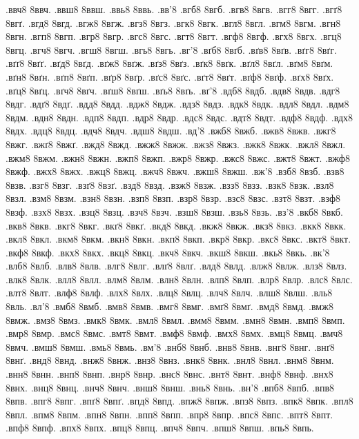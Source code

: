 {.ввч8 8ввч.
.ввш8 8ввш.
.ввь8 8ввь.
.вв'8
.вгб8 8вгб.
.вгв8 8вгв.
.вгг8 8вгг.
.вгґ8 8вгґ.
.вгд8 8вгд.
.вгж8 8вгж.
.вгз8 8вгз.
.вгк8 8вгк.
.вгл8 8вгл.
.вгм8 8вгм.
.вгн8 8вгн.
.вгп8 8вгп.
.вгр8 8вгр.
.вгс8 8вгс.
.вгт8 8вгт.
.вгф8 8вгф.
.вгх8 8вгх.
.вгц8 8вгц.
.вгч8 8вгч.
.вгш8 8вгш.
.вгь8 8вгь.
.вг'8
.вґб8 8вґб.
.вґв8 8вґв.
.вґг8 8вґг.
.вґґ8 8вґґ.
.вґд8 8вґд.
.вґж8 8вґж.
.вґз8 8вґз.
.вґк8 8вґк.
.вґл8 8вґл.
.вґм8 8вґм.
.вґн8 8вґн.
.вґп8 8вґп.
.вґр8 8вґр.
.вґс8 8вґс.
.вґт8 8вґт.
.вґф8 8вґф.
.вґх8 8вґх.
.вґц8 8вґц.
.вґч8 8вґч.
.вґш8 8вґш.
.вґь8 8вґь.
.вґ'8
.вдб8 8вдб.
.вдв8 8вдв.
.вдг8 8вдг.
.вдґ8 8вдґ.
.вдд8 8вдд.
.вдж8 8вдж.
.вдз8 8вдз.
.вдк8 8вдк.
.вдл8 8вдл.
.вдм8 8вдм.
.вдн8 8вдн.
.вдп8 8вдп.
.вдр8 8вдр.
.вдс8 8вдс.
.вдт8 8вдт.
.вдф8 8вдф.
.вдх8 8вдх.
.вдц8 8вдц.
.вдч8 8вдч.
.вдш8 8вдш.
.вд'8
.вжб8 8вжб.
.вжв8 8вжв.
.вжг8 8вжг.
.вжґ8 8вжґ.
.вжд8 8вжд.
.вжж8 8вжж.
.вжз8 8вжз.
.вжк8 8вжк.
.вжл8 8вжл.
.вжм8 8вжм.
.вжн8 8вжн.
.вжп8 8вжп.
.вжр8 8вжр.
.вжс8 8вжс.
.вжт8 8вжт.
.вжф8 8вжф.
.вжх8 8вжх.
.вжц8 8вжц.
.вжч8 8вжч.
.вжш8 8вжш.
.вж'8
.взб8 8взб.
.взв8 8взв.
.взг8 8взг.
.взґ8 8взґ.
.взд8 8взд.
.взж8 8взж.
.взз8 8взз.
.взк8 8взк.
.взл8 8взл.
.взм8 8взм.
.взн8 8взн.
.взп8 8взп.
.взр8 8взр.
.взс8 8взс.
.взт8 8взт.
.взф8 8взф.
.взх8 8взх.
.взц8 8взц.
.взч8 8взч.
.взш8 8взш.
.взь8 8взь.
.вз'8
.вкб8 8вкб.
.вкв8 8вкв.
.вкг8 8вкг.
.вкґ8 8вкґ.
.вкд8 8вкд.
.вкж8 8вкж.
.вкз8 8вкз.
.вкк8 8вкк.
.вкл8 8вкл.
.вкм8 8вкм.
.вкн8 8вкн.
.вкп8 8вкп.
.вкр8 8вкр.
.вкс8 8вкс.
.вкт8 8вкт.
.вкф8 8вкф.
.вкх8 8вкх.
.вкц8 8вкц.
.вкч8 8вкч.
.вкш8 8вкш.
.вкь8 8вкь.
.вк'8
.влб8 8влб.
.влв8 8влв.
.влг8 8влг.
.влґ8 8влґ.
.влд8 8влд.
.влж8 8влж.
.влз8 8влз.
.влк8 8влк.
.влл8 8влл.
.влм8 8влм.
.влн8 8влн.
.влп8 8влп.
.влр8 8влр.
.влс8 8влс.
.влт8 8влт.
.влф8 8влф.
.влх8 8влх.
.влц8 8влц.
.влч8 8влч.
.влш8 8влш.
.вль8 8вль.
.вл'8
.вмб8 8вмб.
.вмв8 8вмв.
.вмг8 8вмг.
.вмґ8 8вмґ.
.вмд8 8вмд.
.вмж8 8вмж.
.вмз8 8вмз.
.вмк8 8вмк.
.вмл8 8вмл.
.вмм8 8вмм.
.вмн8 8вмн.
.вмп8 8вмп.
.вмр8 8вмр.
.вмс8 8вмс.
.вмт8 8вмт.
.вмф8 8вмф.
.вмх8 8вмх.
.вмц8 8вмц.
.вмч8 8вмч.
.вмш8 8вмш.
.вмь8 8вмь.
.вм'8
.внб8 8внб.
.внв8 8внв.
.внг8 8внг.
.внґ8 8внґ.
.внд8 8внд.
.внж8 8внж.
.внз8 8внз.
.внк8 8внк.
.внл8 8внл.
.внм8 8внм.
.внн8 8внн.
.внп8 8внп.
.внр8 8внр.
.внс8 8внс.
.внт8 8внт.
.внф8 8внф.
.внх8 8внх.
.внц8 8внц.
.внч8 8внч.
.внш8 8внш.
.внь8 8внь.
.вн'8
.впб8 8впб.
.впв8 8впв.
.впг8 8впг.
.впґ8 8впґ.
.впд8 8впд.
.впж8 8впж.
.впз8 8впз.
.впк8 8впк.
.впл8 8впл.
.впм8 8впм.
.впн8 8впн.
.впп8 8впп.
.впр8 8впр.
.впс8 8впс.
.впт8 8впт.
.впф8 8впф.
.впх8 8впх.
.впц8 8впц.
.впч8 8впч.
.впш8 8впш.
.впь8 8впь.
}
